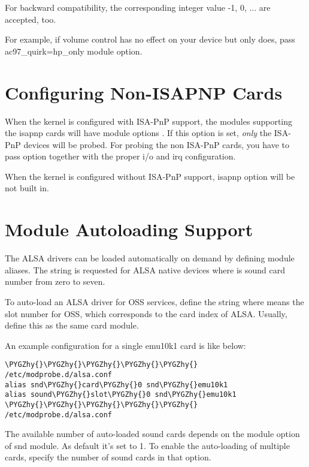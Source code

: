 \documentclass[a4paper,8pt,english]{sphinxmanual}
\def\PYGZhy{\char`\-}
\begin{document}
For backward compatibility, the corresponding integer value -1, 0, ...
are  accepted, too.

For example, if  volume control has no effect on your device
but only  does, pass ac97\_quirk=hp\_only module option.


\section{Configuring Non-ISAPNP Cards}
\label{sound/alsa-configuration:configuring-non-isapnp-cards}
When the kernel is configured with ISA-PnP support, the modules
supporting the isapnp cards will have module options .
If this option is set, \emph{only} the ISA-PnP devices will be probed.
For probing the non ISA-PnP cards, you have to pass  option
together with the proper i/o and irq configuration.

When the kernel is configured without ISA-PnP support, isapnp option
will be not built in.


\section{Module Autoloading Support}
\label{sound/alsa-configuration:module-autoloading-support}
The ALSA drivers can be loaded automatically on demand by defining
module aliases.  The string  is requested for ALSA native
devices where  is sound card number from zero to seven.

To auto-load an ALSA driver for OSS services, define the string
 where  means the slot number for OSS, which
corresponds to the card index of ALSA.  Usually, define this
as the same card module.

An example configuration for a single emu10k1 card is like below:

\begin{Verbatim}[commandchars=\\\{\}]
\PYGZhy{}\PYGZhy{}\PYGZhy{}\PYGZhy{}\PYGZhy{} /etc/modprobe.d/alsa.conf
alias snd\PYGZhy{}card\PYGZhy{}0 snd\PYGZhy{}emu10k1
alias sound\PYGZhy{}slot\PYGZhy{}0 snd\PYGZhy{}emu10k1
\PYGZhy{}\PYGZhy{}\PYGZhy{}\PYGZhy{}\PYGZhy{} /etc/modprobe.d/alsa.conf
\end{Verbatim}

The available number of auto-loaded sound cards depends on the module
option  of snd module.  As default it's set to 1.
To enable the auto-loading of multiple cards, specify the number of
sound cards in that option.
\end{document}
